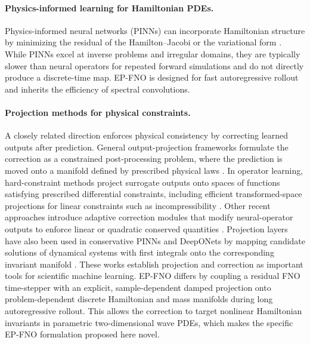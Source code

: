 \documentclass[11pt,a4paper]{article}
\theoremstyle{definition}
\theoremstyle{remark}
\numberwithin{equation}{section}
\numberwithin{figure}{section}
\numberwithin{table}{section}
\begin{document}
\paragraph{Physics-informed learning for Hamiltonian PDEs.}
Physics-informed neural networks (PINNs) \cite{raissi2019physics, obieke2025structure} can incorporate Hamiltonian structure by minimizing the residual of the Hamilton--Jacobi or the variational form \cite{chen2022kam, zhang2022vanishing}.  While PINNs excel at inverse problems and irregular domains, they are typically slower than neural operators for repeated forward simulations and do not directly produce a discrete-time map. EP-FNO is designed for fast autoregressive rollout and inherits the efficiency of spectral convolutions.


\paragraph{Projection methods for physical constraints.}
A closely related direction enforces physical consistency by correcting learned
outputs after prediction. General output-projection frameworks formulate the
correction as a constrained post-processing problem, where the prediction is
moved onto a manifold defined by prescribed physical laws
\cite{valente2025physics}. In operator learning, hard-constraint methods project
surrogate outputs onto spaces of functions satisfying prescribed differential
constraints, including efficient transformed-space projections for linear
constraints such as incompressibility \cite{duruisseaux2024hard}. Other recent
approaches introduce adaptive correction modules that modify neural-operator
outputs to enforce linear or quadratic conserved quantities \cite{liu2025adaptive}. Projection layers have also been used in conservative
PINNs and DeepONets by mapping candidate solutions of dynamical systems with first integrals onto the corresponding invariant manifold \cite{cardosobihlo2025exactly}. These works establish projection and correction
as important tools for scientific machine learning. EP-FNO differs by coupling a
residual FNO time-stepper with an explicit, sample-dependent damped projection
onto problem-dependent discrete Hamiltonian and mass manifolds during long
autoregressive rollout. This allows the correction to target nonlinear
Hamiltonian invariants in parametric two-dimensional wave PDEs, which makes the
specific EP-FNO formulation proposed here novel.
\end{document}
